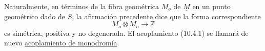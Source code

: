 Naturalmente, en términos de la fibra geométrica $M_o$ de
$\underline M$ en un punto geométrico dado de $S$, la afirmación
precedente dice que la forma correspondiente
\begin{equation*}
M_o\otimes M_o\longrightarrow\mathbb Z
\end{equation*}
es simétrica, positiva y no degenerada. El acoplamiento (10.4.1) se
llamará de nuevo \underline{acoplamiento de monodromía}.
